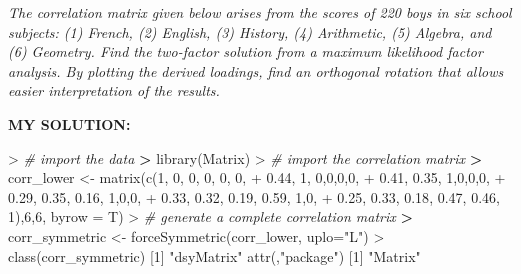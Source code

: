 \documentclass[
]{article}
\newenvironment{Shaded}{\begin{snugshade}}{\end{snugshade}}
\newcommand{\AttributeTok}[1]{\textcolor[rgb]{0.77,0.63,0.00}{#1}}
\newcommand{\CommentTok}[1]{\textcolor[rgb]{0.56,0.35,0.01}{\textit{#1}}}
\newcommand{\DecValTok}[1]{\textcolor[rgb]{0.00,0.00,0.81}{#1}}
\newcommand{\ErrorTok}[1]{\textcolor[rgb]{0.64,0.00,0.00}{\textbf{#1}}}
\newcommand{\FloatTok}[1]{\textcolor[rgb]{0.00,0.00,0.81}{#1}}
\newcommand{\FunctionTok}[1]{\textcolor[rgb]{0.00,0.00,0.00}{#1}}
\newcommand{\NormalTok}[1]{#1}
\newcommand{\OtherTok}[1]{\textcolor[rgb]{0.56,0.35,0.01}{#1}}
\newcommand{\SpecialCharTok}[1]{\textcolor[rgb]{0.00,0.00,0.00}{#1}}
\newcommand{\StringTok}[1]{\textcolor[rgb]{0.31,0.60,0.02}{#1}}
\begin{document}
\emph{The correlation matrix given below arises from the scores of 220
boys in six school subjects: (1) French, (2) English, (3) History, (4)
Arithmetic, (5) Algebra, and (6) Geometry. Find the two-factor solution
from a maximum likelihood factor analysis. By plotting the derived
loadings, find an orthogonal rotation that allows easier interpretation
of the results.}

\textbf{MY SOLUTION:}

\begin{Shaded}
\begin{Highlighting}[]
\SpecialCharTok{\textgreater{}} \CommentTok{\# import the data}
\ErrorTok{\textgreater{}} \FunctionTok{library}\NormalTok{(Matrix)}
\SpecialCharTok{\textgreater{}} \CommentTok{\# import the correlation matrix}
\ErrorTok{\textgreater{}}\NormalTok{ corr\_lower }\OtherTok{\textless{}{-}} \FunctionTok{matrix}\NormalTok{(}\FunctionTok{c}\NormalTok{(}\DecValTok{1}\NormalTok{, }\DecValTok{0}\NormalTok{, }\DecValTok{0}\NormalTok{, }\DecValTok{0}\NormalTok{, }\DecValTok{0}\NormalTok{, }\DecValTok{0}\NormalTok{, }
\SpecialCharTok{+}                       \FloatTok{0.44}\NormalTok{, }\DecValTok{1}\NormalTok{, }\DecValTok{0}\NormalTok{,}\DecValTok{0}\NormalTok{,}\DecValTok{0}\NormalTok{,}\DecValTok{0}\NormalTok{,}
\SpecialCharTok{+}                       \FloatTok{0.41}\NormalTok{, }\FloatTok{0.35}\NormalTok{, }\DecValTok{1}\NormalTok{,}\DecValTok{0}\NormalTok{,}\DecValTok{0}\NormalTok{,}\DecValTok{0}\NormalTok{,}
\SpecialCharTok{+}                       \FloatTok{0.29}\NormalTok{, }\FloatTok{0.35}\NormalTok{, }\FloatTok{0.16}\NormalTok{, }\DecValTok{1}\NormalTok{,}\DecValTok{0}\NormalTok{,}\DecValTok{0}\NormalTok{,}
\SpecialCharTok{+}                       \FloatTok{0.33}\NormalTok{, }\FloatTok{0.32}\NormalTok{, }\FloatTok{0.19}\NormalTok{, }\FloatTok{0.59}\NormalTok{, }\DecValTok{1}\NormalTok{,}\DecValTok{0}\NormalTok{,}
\SpecialCharTok{+}                       \FloatTok{0.25}\NormalTok{, }\FloatTok{0.33}\NormalTok{, }\FloatTok{0.18}\NormalTok{, }\FloatTok{0.47}\NormalTok{, }\FloatTok{0.46}\NormalTok{, }\DecValTok{1}\NormalTok{),}\DecValTok{6}\NormalTok{,}\DecValTok{6}\NormalTok{, }\AttributeTok{byrow =}\NormalTok{ T)}
\SpecialCharTok{\textgreater{}} \CommentTok{\# generate a complete correlation matrix}
\ErrorTok{\textgreater{}}\NormalTok{ corr\_symmetric }\OtherTok{\textless{}{-}} \FunctionTok{forceSymmetric}\NormalTok{(corr\_lower, }\AttributeTok{uplo=}\StringTok{"L"}\NormalTok{)}
\SpecialCharTok{\textgreater{}} \FunctionTok{class}\NormalTok{(corr\_symmetric)}
\NormalTok{[}\DecValTok{1}\NormalTok{] }\StringTok{"dsyMatrix"}
\FunctionTok{attr}\NormalTok{(,}\StringTok{"package"}\NormalTok{)}
\NormalTok{[}\DecValTok{1}\NormalTok{] }\StringTok{"Matrix"}
\end{Highlighting}
\end{Shaded}
\end{document}
